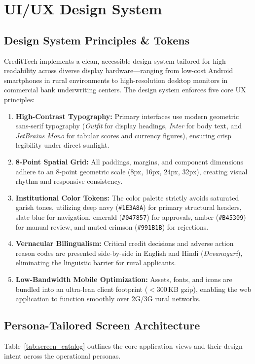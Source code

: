 \documentclass[11pt,a4paper,oneside]{report}
\begin{document}
\chapter{UI/UX Design System}
\label{chap:ui_ux}

\section{Design System Principles \& Tokens}
CreditTech implements a clean, accessible design system tailored for high readability across diverse display hardware---ranging from low-cost Android smartphones in rural environments to high-resolution desktop monitors in commercial bank underwriting centers. The design system enforces five core UX principles:

\begin{enumerate}
  \item \textbf{High-Contrast Typography:} Primary interfaces use modern geometric sans-serif typography (\textit{Outfit} for display headings, \textit{Inter} for body text, and \textit{JetBrains Mono} for tabular scores and currency figures), ensuring crisp legibility under direct sunlight.
  \item \textbf{8-Point Spatial Grid:} All paddings, margins, and component dimensions adhere to an 8-point geometric scale (8px, 16px, 24px, 32px), creating visual rhythm and responsive consistency.
  \item \textbf{Institutional Color Tokens:} The color palette strictly avoids saturated garish tones, utilizing deep navy (\texttt{\#1E3A8A}) for primary structural headers, slate blue for navigation, emerald (\texttt{\#047857}) for approvals, amber (\texttt{\#B45309}) for manual review, and muted crimson (\texttt{\#991B1B}) for rejections.
  \item \textbf{Vernacular Bilingualism:} Critical credit decisions and adverse action reason codes are presented side-by-side in English and Hindi (\textit{Devanagari}), eliminating the linguistic barrier for rural applicants.
  \item \textbf{Low-Bandwidth Mobile Optimization:} Assets, fonts, and icons are bundled into an ultra-lean client footprint ($<300$\,KB gzip), enabling the web application to function smoothly over 2G/3G rural networks.
\end{enumerate}

\section{Persona-Tailored Screen Architecture}
Table~\ref{tab:screen_catalog} outlines the core application views and their design intent across the operational personas.
\end{document}
